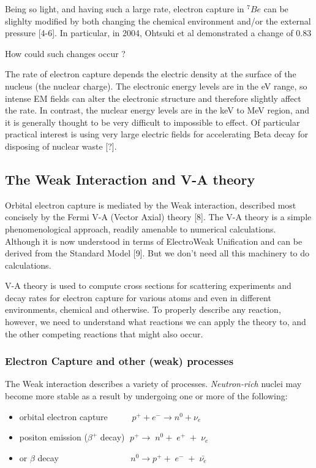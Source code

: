 \documentclass[11pt]{amsart}
\begin{document}
Being so light, and having such a large rate, electron capture in $^{7}Be$ can be slighlty modified by both changing the chemical environment and/or the external pressure [4-6]. In particular, in 2004, Ohtsuki et al demonstrated a change of 0.83%

How could such changes occur ?

The rate of electron capture depends the electric density at the surface of the nucleus (the nuclear charge).   The electronic energy levels are in the eV range, so intense EM fields can alter the electronic structure and therefore slightly affect the rate. In contrast, the nuclear energy levels are in the keV to MeV region, and it is generally thought to be very difficult to impossible to effect. Of particular practical interest is using very large electric fields for accelerating Beta decay for disposing of nuclear waste [?].

\subsection{The Weak Interaction and V-A theory}

Orbital electron capture is mediated by the Weak interaction, described most concisely by the Fermi V-A (Vector Axial) theory [8].
The V-A theory is a simple phenomenological approach, readily amenable to numerical calculations.   Although it is now understood in terms of ElectroWeak Unification and can be derived from the Standard Model [9]. But we don't need all this machinery to do calculations.

V-A theory is used to compute cross sections for scattering experiments and decay rates for electron capture for various atoms and even in different environments, chemical and otherwise.  To properly describe any reaction, however, we need to understand what reactions we can apply the theory to, and the other competing reactions that might also occur.

\subsubsection{Electron Capture and other (weak) processes} 

The Weak interaction describes a variety of processes.  \emph{Neutron-rich} nuclei may become more stable as a result by undergoing one or more of the following:


\begin{itemize}
\item orbital electron capture $\;\;\;\;\;\;\;\;\;p^{+}+e^{-} \rightarrow n^{0}+\nu_{e}$

\item positon emission ($\beta^{+}$ decay) $\;p^{+}\rightarrow\;n^{0}+\;e^{+}\;+\;\nu_{e}$ 
\item or $\beta$ decay $\;\;\;\;\;\;\;\;\;\;\;\;\;\;\;\;\;\;\;\;\;\;\;\;\;\;\;\;\;n^{0}\rightarrow p^{+}+\;e^{-}\;+\;\bar{\nu_{e}}$
\end{itemize}
\end{document}
